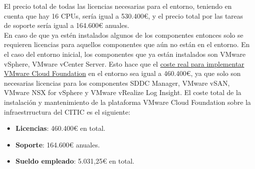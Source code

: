 El precio total de todas las licencias necesarias para el entorno, teniendo en cuenta que hay 16 CPUs, sería igual a 530.400€, y el precio total por las tareas de soporte sería igual a 164.600€ anuales.\\

En caso de que ya estén instalados algunos de los componentes entonces solo se requieren licencias para aquellos componentes que aún no están en el entorno. En el caso del entorno inicial, los componentes que ya están instalados son VMware vSphere, VMware vCenter Server. Esto hace que el \underline{coste real para implementar VMware Cloud Foundation} en el entorno sea igual a 460.400€, ya que solo son necesarias licencias para los componentes SDDC Manager, VMware vSAN, VMware NSX for vSphere y VMware vRealize Log Insight. El coste total de la instalación y mantenimiento de la plataforma VMware Cloud Foundation sobre la infraestrructura del CITIC es el siguiente:

    \begin{itemize}
        \item \textbf{Licencias}: 460.400€ en total.
        \item \textbf{Soporte}: 164.600€ anuales.
        \item \textbf{Sueldo empleado}: 5.031,25€ en total.
    \end{itemize}


